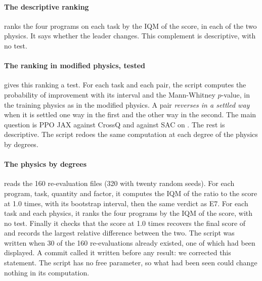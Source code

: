 \paragraph{The descriptive ranking}
 ranks the four programs on each task by the IQM of the score, in each of the two
physics. It says whether the leader changes. This complement is descriptive, with no test.

\paragraph{The ranking in modified physics, tested}
 gives this ranking a test. For each task and each pair,
the script computes the probability of improvement with
its interval and the Mann-Whitney $p$-value, in the training physics as in the modified physics. A pair
\emph{reverses in a settled way} when it is settled one way in the first and the other way in the second. The
main question is PPO JAX against CrossQ and against SAC on . The rest is
descriptive. The script redoes the same computation at each degree of the physics by degrees.

\paragraph{The physics by degrees}
 reads the 160 re-evaluation files (320 with twenty random seeds). For each program,
task, quantity and factor, it computes the IQM of the ratio to the score at 1.0 times, with its bootstrap
interval, then the same verdict as E7. For each task and each physics, it ranks the four programs by the IQM
of the score, with no test. Finally it checks that the score at 1.0 times recovers the final score of
 and records the largest relative difference between the two. The script was written when 30 of the 160
re-evaluations already existed, one of which had been displayed. A commit called it written before any result:
we corrected this statement. The script has no free parameter, so what had been seen could change nothing in
its computation.

